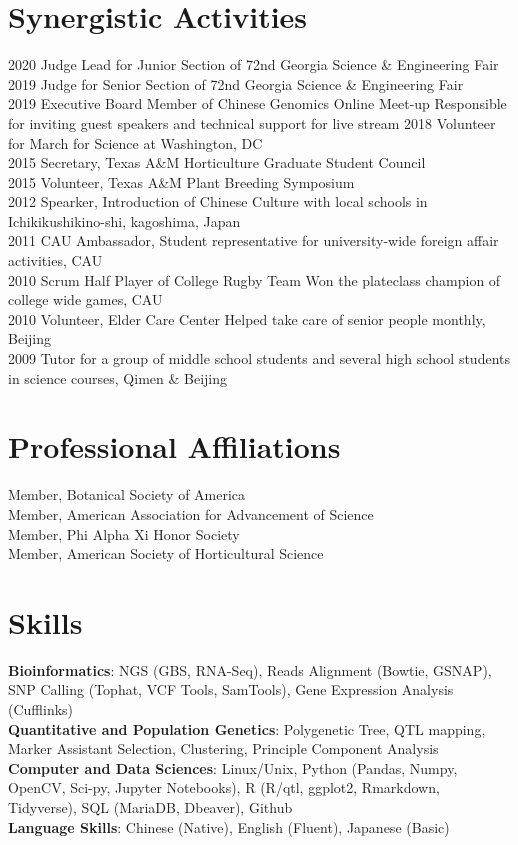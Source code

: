 \documentclass[11pt, a4paper]{awesome-cv}
\begin{document}
\section{Synergistic Activities}\label{synergistic-activities}

2020 Judge Lead for Junior Section of 72nd Georgia Science \&
Engineering Fair\\
2019 Judge for Senior Section of 72nd Georgia Science \& Engineering
Fair\\
2019 Executive Board Member of Chinese Genomics Online Meet-up
\textbar{} Responsible for inviting guest speakers and technical support
for live stream 2018 Volunteer for March for Science at Washington, DC\\
2015 Secretary, Texas A\&M Horticulture Graduate Student Council\\
2015 Volunteer, Texas A\&M Plant Breeding Symposium\\
2012 Spearker, Introduction of Chinese Culture with local schools in
Ichikikushikino-shi, kagoshima, Japan\\
2011 CAU Ambassador, Student representative for university-wide foreign
affair activities, CAU\\
2010 Scrum Half Player of College Rugby Team \textbar{} Won the
plateclass champion of college wide games, CAU\\
2010 Volunteer, Elder Care Center \textbar{} Helped take care of senior
people monthly, Beijing\\
2009 Tutor for a group of middle school students and several high school
students in science courses, Qimen \& Beijing

\section{Professional Affiliations}\label{professional-affiliations}

Member, Botanical Society of America\\
Member, American Association for Advancement of Science\\
Member, Phi Alpha Xi Honor Society\\
Member, American Society of Horticultural Science

\section{Skills}\label{skills}

\textbf{Bioinformatics}: NGS (GBS, RNA-Seq), Reads Alignment (Bowtie,
GSNAP), SNP Calling (Tophat, VCF Tools, SamTools), Gene Expression
Analysis (Cufflinks)\\
\textbf{Quantitative and Population Genetics}: Polygenetic Tree, QTL
mapping, Marker Assistant Selection, Clustering, Principle Component
Analysis\\
\textbf{Computer and Data Sciences}: Linux/Unix, Python (Pandas, Numpy,
OpenCV, Sci-py, Jupyter Notebooks), R (R/qtl, ggplot2, Rmarkdown,
Tidyverse), SQL (MariaDB, Dbeaver), Github\\
\textbf{Language Skills}: Chinese (Native), English (Fluent), Japanese
(Basic)
\end{document}
